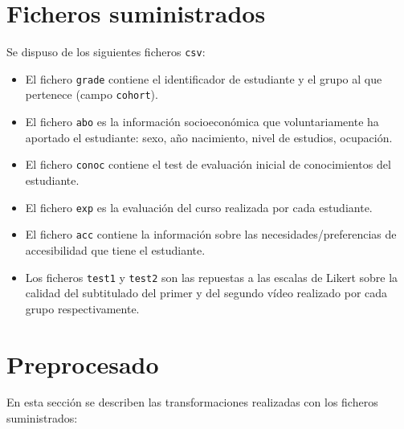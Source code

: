 \documentclass[
  12pt,
  a4paper,
  extrafontsizes,
  onecolumn,
  openright,
  table]{memoir}
\providecommand{\tightlist}{%
  \setlength{\itemsep}{0pt}\setlength{\parskip}{0pt}}\usepackage{longtable,booktabs,array}
\begin{document}
\hypertarget{ficheros-suministrados}{%
\section{Ficheros suministrados}\label{ficheros-suministrados}}

Se dispuso de los siguientes ficheros \texttt{csv}:

\begin{itemize}
\tightlist
\item
  El fichero \texttt{grade} contiene el identificador de estudiante y el
  grupo al que pertenece (campo \texttt{cohort}).
\item
  El fichero \texttt{abo} es la información socioeconómica que
  voluntariamente ha aportado el estudiante: sexo, año nacimiento, nivel
  de estudios, ocupación.
\item
  El fichero \texttt{conoc} contiene el test de evaluación inicial de
  conocimientos del estudiante.
\item
  El fichero \texttt{exp} es la evaluación del curso realizada por cada
  estudiante.
\item
  El fichero \texttt{acc} contiene la información sobre las
  necesidades/preferencias de accesibilidad que tiene el estudiante.
\item
  Los ficheros \texttt{test1} y \texttt{test2} son las repuestas a las
  escalas de Likert sobre la calidad del subtitulado del primer y del
  segundo vídeo realizado por cada grupo respectivamente.
\end{itemize}

\hypertarget{sec-preprocesado}{%
\section{Preprocesado}\label{sec-preprocesado}}

En esta sección se describen las transformaciones realizadas con los
ficheros suministrados:
\end{document}
